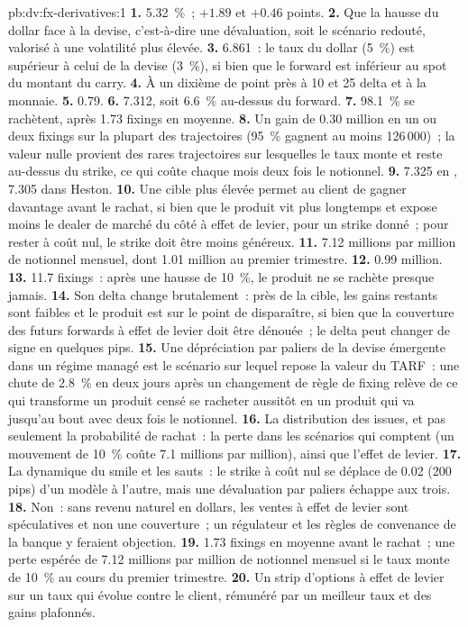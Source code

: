 \begin{solution}{pb:dv:fx-derivatives:1}
\textbf{1.} 5.32~\%~; $+1.89$ et $+0.46$ points.
\textbf{2.} Que la hausse du dollar face à la devise, c'est-à-dire une dévaluation, soit le scénario redouté, valorisé à une volatilité plus élevée.
\textbf{3.} 6.861~: le taux du dollar (5~\%) est supérieur à celui de la devise (3~\%), si bien que le forward est inférieur au spot du montant du carry.
\textbf{4.} À un dixième de point près à 10 et 25 delta et à la monnaie.
\textbf{5.} 0.79.
\textbf{6.} 7.312, soit 6.6~\% au-dessus du forward.
\textbf{7.} 98.1~\% se rachètent, après 1.73 fixings en moyenne.
\textbf{8.} Un gain de 0.30 million en un ou deux fixings sur la plupart des trajectoires (95~\% gagnent au moins 126\,000)~; la valeur nulle provient des rares trajectoires sur lesquelles le
taux monte et reste au-dessus du strike, ce qui coûte chaque mois deux fois le notionnel.
\textbf{9.} 7.325 en , 7.305 dans Heston.
\textbf{10.} Une cible plus élevée permet au client de gagner davantage avant le rachat, si bien que le produit vit plus longtemps et expose moins le dealer de marché du côté
à effet de levier, pour un strike donné~; pour rester à coût nul, le strike doit être moins généreux.
\textbf{11.} 7.12 millions par million de notionnel mensuel, dont 1.01 million au premier trimestre.
\textbf{12.} 0.99 million.
\textbf{13.} 11.7 fixings~: après une hausse de 10~\%, le produit ne se rachète presque jamais.
\textbf{14.} Son delta change brutalement~: près de la cible, les gains restants sont faibles et le produit est sur le point de disparaître, si bien que la couverture des futurs
forwards à effet de levier doit être dénouée~; le delta peut changer de signe en quelques pips.
\textbf{15.} Une dépréciation par paliers de la devise émergente dans un régime managé est le scénario sur lequel repose la valeur du TARF~: une chute de 2.8~\% en deux jours après un
changement de règle de fixing relève de ce qui transforme un produit censé se racheter aussitôt en un produit qui va jusqu'au bout avec deux fois le notionnel.
\textbf{16.} La distribution des issues, et pas seulement la probabilité de rachat~: la perte dans les scénarios qui comptent (un mouvement de 10~\% coûte 7.1 millions par
million), ainsi que l'effet de levier.
\textbf{17.} La dynamique du smile et les sauts~: le strike à coût nul se déplace de 0.02 (200 pips) d'un modèle à l'autre, mais une dévaluation par paliers échappe aux trois.
\textbf{18.} Non~: sans revenu naturel en dollars, les ventes à effet de levier sont spéculatives et non une couverture~; un régulateur et les règles de convenance de la banque y feraient objection.
\textbf{19.} 1.73 fixings en moyenne avant le rachat~; une perte espérée de 7.12 millions par million de notionnel mensuel si le taux monte de 10~\% au cours du premier
trimestre.
\textbf{20.} Un strip d'options à effet de levier sur un taux qui évolue contre le client, rémunéré par un meilleur taux et des gains plafonnés.
\end{solution}

